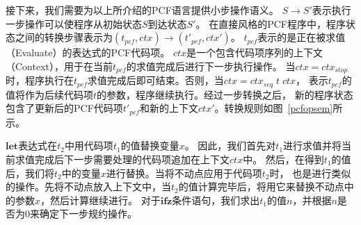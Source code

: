 接下来，我们需要为以上所介绍的PCF语言提供小步操作语义。
$S\rightarrow S'$表示执行一步操作可以使程序从初始状态$S$到达状态$S'$。
在直接风格的PCF程序中，程序状态之间的转换步骤表示为$(t_{pcf},ctx)\rightarrow (t'_{pcf},ctx')$。
$t_{pcf}$表示的是正在被求值（Evaluate）的表达式的PCF代码项。
$ctx$是一个包含代码项序列的上下文（Context），用于在当前$t_{pcf}$的求值完成后进行下一步执行操作。
当$ctx = ctx_{stop}$时，程序执行在$t_{pcf}$求值完成后即可结束。否则，当$ctx = ctx_{seq}\; t\; ctx$，
表示$t_{pcf}$的值将作为后续代码项$t$的参数，程序继续执行。经过一步转换之后，
新的程序状态包含了更新后的PCF代码项$t'_{pcf}$和新的上下文$ctx'$。转换规则如图~\ref{pcfopsem}所示。

$\mathbf{let}$表达式在$t_2$中用代码项$t_1$的值替换变量$x$。
因此，我们首先对$t_1$进行求值并将当前求值完成后下一步需要处理的代码项追加在上下文$ctx$中。
然后，在得到$t_1$的值后，我们将$t_2$中的变量$x$进行替换。当将不动点应用于代码项$t_2$时，
也是进行类似的操作。先将不动点放入上下文中，当$t_2$的值计算完毕后，将用它来替换不动点中的参数$x$，然后计算继续进行。
对于$\mathbf{ifz}$条件语句，我们求出$t_1$的值$n$，并根据$n$是否为0来确定下一步规约操作。

